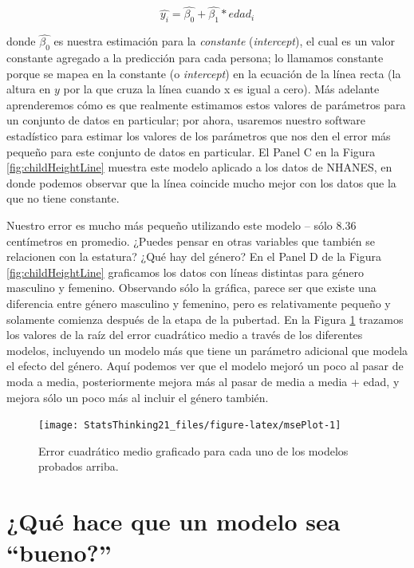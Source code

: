 \documentclass[
  12pt,
]{book}
\begin{document}
\[
\widehat{y_i} = \hat{\beta_0} + \hat{\beta_1} * edad_i
\]

donde \(\hat{\beta_0}\) es nuestra estimación para la \emph{constante} (\emph{intercept}), el cual es un valor constante agregado a la predicción para cada persona; lo llamamos constante porque se mapea en la constante (o \emph{intercept}) en la ecuación de la línea recta (la altura en \(y\) por la que cruza la línea cuando x es igual a cero). Más adelante aprenderemos cómo es que realmente estimamos estos valores de parámetros para un conjunto de datos en particular; por ahora, usaremos nuestro software estadístico para estimar los valores de los parámetros que nos den el error más pequeño para este conjunto de datos en particular. El Panel C en la Figura \ref{fig:childHeightLine} muestra este modelo aplicado a los datos de NHANES, en donde podemos observar que la línea coincide mucho mejor con los datos que la que no tiene constante.

Nuestro error es mucho más pequeño utilizando este modelo -- sólo 8.36 centímetros en promedio. ¿Puedes pensar en otras variables que también se relacionen con la estatura? ¿Qué hay del género? En el Panel D de la Figura \ref{fig:childHeightLine} graficamos los datos con líneas distintas para género masculino y femenino. Observando sólo la gráfica, parece ser que existe una diferencia entre género masculino y femenino, pero es relativamente pequeño y solamente comienza después de la etapa de la pubertad. En la Figura \ref{fig:msePlot} trazamos los valores de la raíz del error cuadrático medio a través de los diferentes modelos, incluyendo un modelo más que tiene un parámetro adicional que modela el efecto del género. Aquí podemos ver que el modelo mejoró un poco al pasar de moda a media, posteriormente mejora más al pasar de media a media + edad, y mejora sólo un poco más al incluir el género también.

\begin{figure}
\texttt{[image: StatsThinking21\_files/figure-latex/msePlot-1]} \caption{Error cuadrático medio graficado para cada uno de los modelos probados arriba.}\label{fig:msePlot}
\end{figure}

\hypertarget{quuxe9-hace-que-un-modelo-sea-bueno}{%
\section{¿Qué hace que un modelo sea ``bueno?''}\label{quuxe9-hace-que-un-modelo-sea-bueno}}
\end{document}
